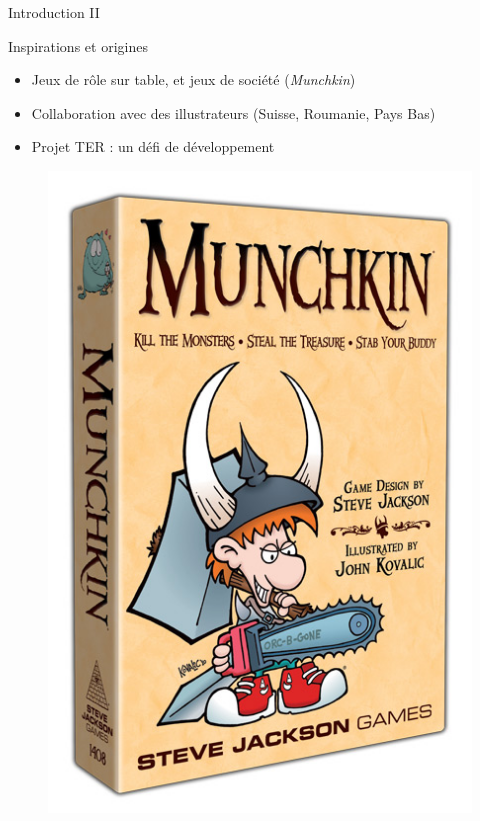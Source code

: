 \documentclass{bredelebeamer}
\begin{document}
\begin{frame}{Introduction II}
    \begin{block}{Inspirations et origines}
      \begin{itemize}
        \item {Jeux de rôle sur table, et jeux de société (\textit{Munchkin})}
        \pause
        \item {Collaboration avec des illustrateurs (Suisse, Roumanie, Pays Bas)}
        \pause
        \item {Projet TER : un défi de développement}
      \end{itemize}
    \end{block}
    
    \begin{figure}
    	\centering
    	\includegraphics[scale=0.15]{munchkin.jpg}
    	\hspace{0.5cm}

\end{figure}
\end{frame}
\end{document}
